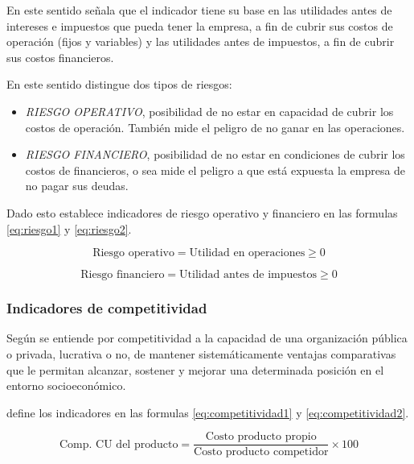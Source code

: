 En este sentido \cite{cruz} señala que el indicador tiene su base en las
utilidades antes de intereses e impuestos que pueda tener la empresa, a fin de
cubrir sus costos de operación (fijos y variables) y las utilidades antes de
impuestos, a fin de cubrir sus costos financieros.

En este sentido \cite{cruz} distingue dos tipos de riesgos:
\begin{itemize}
    \item \emph{RIESGO OPERATIVO}, posibilidad de no estar en capacidad de cubrir
          los costos de operación. También mide el peligro de no ganar en las
          operaciones.
    \item \emph{RIESGO FINANCIERO}, posibilidad de no estar en condiciones de
          cubrir los costos de financieros, o sea mide el peligro a que está
          expuesta la empresa de no pagar sus deudas.
\end{itemize}

Dado esto \cite{cruz} establece indicadores de riesgo operativo y financiero en las
formulas \ref{eq:riesgo1} y \ref{eq:riesgo2}.

\begin{equation}\label{eq:riesgo1}
    \text{Riesgo operativo} = \text{Utilidad en operaciones} \geq 0
\end{equation}

\begin{equation}\label{eq:riesgo2}
    \text{Riesgo financiero} = \text{Utilidad antes de impuestos} \geq 0
\end{equation}

\subsubsection{Indicadores de competitividad}
Según \cite{cruz} se entiende por competitividad a la capacidad de una organización
pública o privada, lucrativa o no, de mantener sistemáticamente ventajas comparativas
que le permitan alcanzar, sostener y mejorar una determinada posición en el entorno
socioeconómico.

\cite{cruz} define los indicadores en las formulas \ref{eq:competitividad1} y
\ref{eq:competitividad2}.

\begin{equation}\label{eq:competitividad1}
    \text{Comp. CU del producto} = \frac{\text{Costo producto propio}}{\text{Costo producto competidor}} \times{100}
\end{equation}

